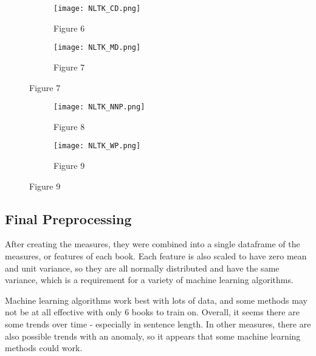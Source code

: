 \documentclass[11pt,a4paper,reqno]{amsart}
\begin{document}
\begin{figure}[!h]
\centering
\begin{subfigure}{.5\textwidth}
  \centering
  \texttt{[image: NLTK\_CD.png]}
  \caption*{Figure 6}
\end{subfigure}%
\begin{subfigure}{.5\textwidth}
  \centering
  \texttt{[image: NLTK\_MD.png]}
  \caption*{Figure 7}
\end{subfigure}
\end{figure}

\begin{figure}[!h]
\centering
\begin{subfigure}{.5\textwidth}
  \centering
  \texttt{[image: NLTK\_NNP.png]}
  \caption*{Figure 8}
\end{subfigure}%
\begin{subfigure}{.5\textwidth}
  \centering
  \texttt{[image: NLTK\_WP.png]}
  \caption*{Figure 9}
\end{subfigure}
\end{figure}

\subsection{Final Preprocessing}
After creating the measures, they were combined into a single dataframe of the measures, or features of each book. Each feature is also scaled to have zero mean and unit variance, so they are all normally distributed and have the same variance, which is a requirement for a variety of machine learning algorithms.

Machine learning algorithms work best with lots of data, and some methods may not be at all effective with only 6 books to train on. Overall, it seems there are some trends over time - especially in sentence length. In other measures, there are also possible trends with an anomaly, so it appears that some machine learning methods could work. 



%
\end{document}
